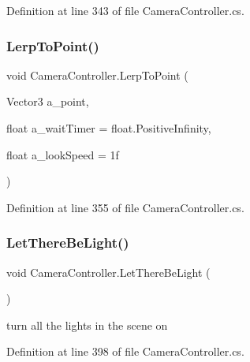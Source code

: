 Definition at line 343 of file Camera\+Controller.\+cs.

\mbox{\label{class_camera_controller_a90cd597ab3d5586711544b3f449eb68d}} 
\subsubsection{\texorpdfstring{Lerp\+To\+Point()}{LerpToPoint()}}
{\footnotesize\ttfamily void Camera\+Controller.\+Lerp\+To\+Point (\begin{DoxyParamCaption}\item[{Vector3}]{a\+\_\+point,  }\item[{float}]{a\+\_\+wait\+Timer = {\ttfamily float.PositiveInfinity},  }\item[{float}]{a\+\_\+look\+Speed = {\ttfamily 1f} }\end{DoxyParamCaption})}



Definition at line 355 of file Camera\+Controller.\+cs.

\mbox{\label{class_camera_controller_a66d5c10c02d5c08b89ad623afde6cdf2}} 
\subsubsection{\texorpdfstring{Let\+There\+Be\+Light()}{LetThereBeLight()}}
{\footnotesize\ttfamily void Camera\+Controller.\+Let\+There\+Be\+Light (\begin{DoxyParamCaption}{ }\end{DoxyParamCaption})}



turn all the lights in the scene on 



Definition at line 398 of file Camera\+Controller.\+cs.

\mbox{\label{class_camera_controller_acebc21dbad7ad835eb72706bee190c77}} 

